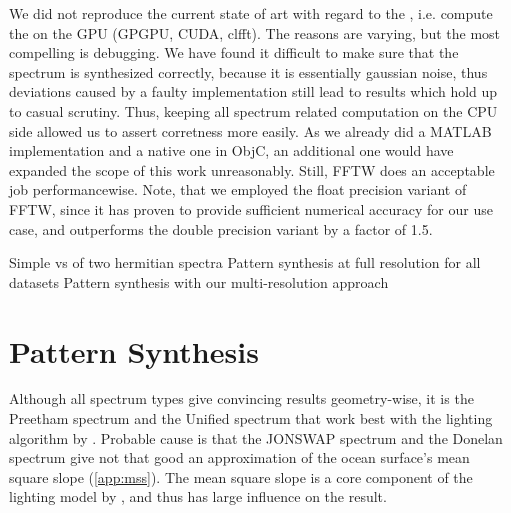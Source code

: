 


We did not reproduce the current state of art with regard to the \FourierTransform,
i.e. compute the \IDFT on the GPU (GPGPU, CUDA, clfft). The reasons are varying,
but the most compelling is debugging. We have found it difficult to make sure
that the spectrum is synthesized correctly, because it is essentially gaussian noise,
thus deviations caused by a faulty implementation still lead to results which hold
up to casual scrutiny. Thus, keeping all spectrum related computation on the
CPU side allowed us to assert corretness more easily.
As we already did a MATLAB implementation and a native one
in ObjC, an additional one would have expanded the scope of this work unreasonably.
Still, FFTW does an acceptable job performancewise. Note, that we employed the
float precision variant of FFTW, since it has proven to provide sufficient
numerical accuracy for our use case, and outperforms the double precision variant
by a factor of 1.5.

Simple \InvFourierTransform vs \InvFourierTransform of two hermitian spectra
Pattern synthesis at full resolution for all datasets
Pattern synthesis with our multi-resolution approach

\section{Pattern Synthesis}
\label{sec:results:synthesis}
Although all spectrum types give convincing results geometry-wise, it is the
Preetham spectrum and the Unified spectrum that work best with the lighting
algorithm by \cite{article:oceanlighting}. Probable cause is that the JONSWAP
spectrum and the Donelan spectrum give not that good an approximation of the
ocean surface's mean square slope (\ref{app:mss}). The mean square slope is a
core component of the lighting model by \cite{article:oceanlighting}, and thus
has large influence on the result.

